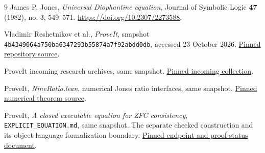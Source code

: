 \documentclass[11pt]{article}
\theoremstyle{remark}\newtheorem{remark}[theorem]{Remark}
\begin{document}
\begin{thebibliography}{9}
James P. Jones, \emph{Universal Diophantine equation},
Journal of Symbolic Logic \textbf{47} (1982), no. 3, 549--571.
\url{https://doi.org/10.2307/2273588}.

Vladimir Reshetnikov et al., \emph{ProveIt}, snapshot
\texttt{4b4349064a750ba6347293b55874a7f92abdd0db}, accessed 23 October 2026.
\href{https://github.com/VladimirReshetnikov/ProveIt/tree/4b4349064a750ba6347293b55874a7f92abdd0db/Computability/DiophantineConsistency}{Pinned repository source}.

ProveIt incoming research archives, same snapshot.
\href{https://github.com/VladimirReshetnikov/ProveIt/tree/4b4349064a750ba6347293b55874a7f92abdd0db/docs/incoming}{Pinned incoming collection}.

ProveIt, \emph{NineRatio.lean}, numerical Jones ratio interfaces, same snapshot.
\href{https://github.com/VladimirReshetnikov/ProveIt/blob/4b4349064a750ba6347293b55874a7f92abdd0db/Computability/HilbertTenthProblem/Lean/Diophantine/Paper1982/NineRatio.lean}{Pinned numerical theorem source}.

ProveIt, \emph{A closed executable equation for ZFC consistency},
\texttt{EXPLICIT\_EQUATION.md}, same snapshot. The separate checked
construction and its object-language formalization boundary.
\href{https://github.com/VladimirReshetnikov/ProveIt/blob/4b4349064a750ba6347293b55874a7f92abdd0db/Computability/DiophantineConsistency/EXPLICIT_EQUATION.md}{Pinned endpoint and proof-status document}.
\end{thebibliography}
\end{document}
